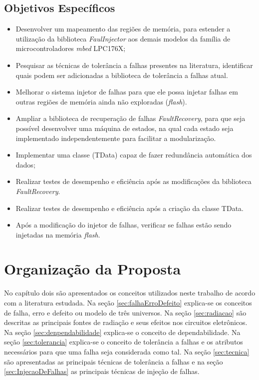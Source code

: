 \subsection{Objetivos Específicos}\label{Sec:ObjetivosEspecificos}
\begin{itemize}
	
	\item  Desenvolver um mapeamento das regiões de memória, para estender a utilização da biblioteca \textit{FaulInjector} aos demais modelos da família de microcontroladores \textit{mbed} LPC176X;
	
	\item Pesquisar as técnicas de tolerância a falhas presentes na literatura, identificar quais podem ser adicionadas a biblioteca de tolerância a falhas atual. 
	
	\item Melhorar o sistema injetor de falhas para que ele possa injetar falhas em outras regiões de memória ainda não exploradas (\textit{flash}).	
	
	\item Ampliar a biblioteca de recuperação de falhas \textit{FaultRecovery}, para que seja possível desenvolver uma máquina de estados, na qual cada estado seja implementado independentemente para facilitar a modularização.
	
	\item Implementar uma classe (TData) capaz de fazer redundância automática dos dados;
	
	\item Realizar testes de desempenho e eficiência após as modificações da biblioteca \textit{FaultRecovery}.
	
	\item Realizar testes de desempenho e eficiência após a criação da classe TData.
	
	\item Após a modificação do injetor de falhas, verificar se falhas estão sendo injetadas na memória \textit{flash}. 						
	
\end{itemize}


\newpage

\section{Organização da Proposta} \label{Sec:Organizacao}

No capítulo dois são apresentados os conceitos utilizados neste trabalho de acordo com a literatura estudada. Na seção \ref{sec:falhaErroDefeito} explica-se os conceitos de falha, erro e defeito ou modelo de três universos. Na seção \ref{sec:radiacao} são descritas as principais fontes de radiação e seus efeitos nos circuitos eletrônicos. Na seção \ref{sec:denpendabilidade} explica-se o conceito de dependabilidade. Na seção \ref{sec:tolerancia} explica-se o conceito de tolerância a falhas e os atributos necessários para que uma falha seja considerada como tal. Na seção \ref{sec:tecnica} são apresentadas as principais técnicas de tolerância a falhas e na seção \ref{sec:InjecaoDeFalhas} as principais técnicas de injeção de falhas.

